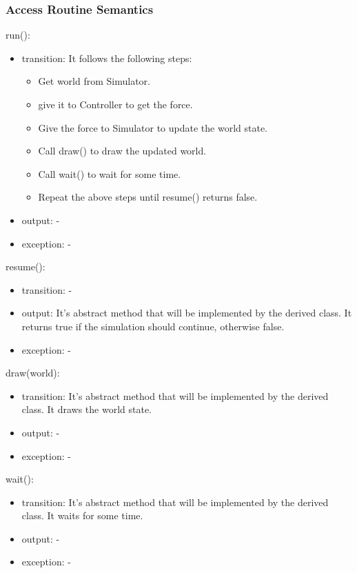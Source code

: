 \documentclass[12pt, titlepage]{article}
\begin{document}
\subsubsection{Access Routine Semantics}

\noindent run():
\begin{itemize}
\item transition:
      It follows the following steps:
      \begin{itemize}
        \item Get world from Simulator.
        \item give it to Controller to get the force.
        \item Give the force to Simulator to update the world state.
        \item Call draw() to draw the updated world.
        \item Call wait() to wait for some time.
        \item Repeat the above steps until resume() returns false.
      \end{itemize}
\item output: -
\item exception: -
\end{itemize}

\noindent resume():
\begin{itemize}
\item transition: -
\item output: It's abstract method that will be implemented by the derived class.
      It returns true if the simulation should continue, otherwise false.
\item exception: -
\end{itemize}

\noindent draw(world):
\begin{itemize}
\item transition: It's abstract method that will be implemented by the derived class. 
      It draws the world state.
\item output: -
\item exception: -
\end{itemize}

\noindent wait():
\begin{itemize}
\item transition: It's abstract method that will be implemented by the derived class. 
      It waits for some time.
\item output: -
\item exception: -
\end{itemize}
\end{document}
